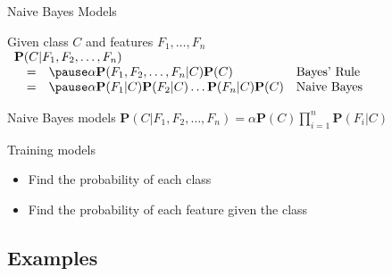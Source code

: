 \documentclass[14pt]{beamer}
\begin{document}
\begin{frame}{Naive Bayes Models}
\begin{block}{Given class $C$ and features $F_1,\ldots,F_n$}
$
\begin{array}{llll}
\lefteqn{\mathbf{P}(C|F_1,F_2,\ldots,F_n)} \\
& = & \pause\alpha\mathbf{P}(F_1,F_2,\ldots,F_n|C)\mathbf{P}(C) & \mbox{Bayes' Rule} \\
& = & \pause\alpha\mathbf{P}(F_1|C)\mathbf{P}(F_2|C)\ldots\mathbf{P}(F_n|C)\mathbf{P}(C) & \mbox{Naive Bayes}
\end{array}
$
\end{block}
\pause
\vspace{-1pt}
\begin{block}{Naive Bayes models}
$\mathbf{P}(C|F_1,F_2,\ldots,F_n) = \alpha\mathbf{P}(C)\prod\limits_{i=1}^{n}\mathbf{P}(F_{i}|C)$
\end{block}
\pause
\vspace{-1pt}
\begin{block}{Training models}
\begin{itemize}
\item Find the probability of each class
\item Find the probability of each feature given the class
\end{itemize}
\end{block}
\end{frame}

\subsection{Examples}
\end{document}
